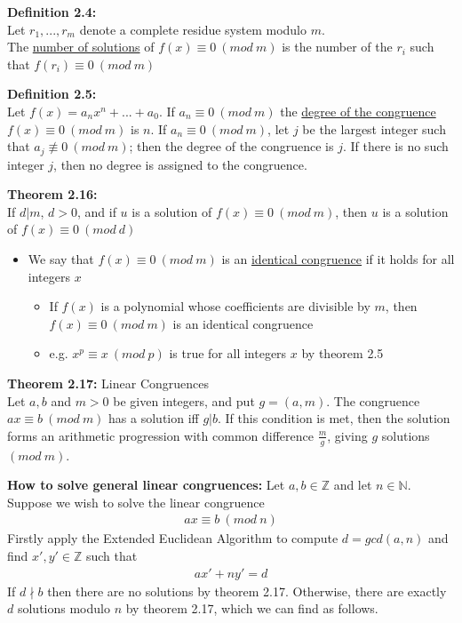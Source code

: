 \documentclass[a4paper]{article}
\begin{document}
\textbf{Definition 2.4:}\\
Let $r_1,...,r_m$ denote a complete residue system modulo $m$.\\
The \underline{number of solutions} of $f(x)\equiv0\ (mod\ m)$ is the number of
the $r_i$ such that $f(r_i)\equiv0\ (mod\ m)$


\textbf{Definition 2.5:}\\
Let $f(x)=a_nx^n+...+a_0$. If $a_n\equiv0\ (mod\ m)$ the
\underline{degree of the congruence} $f(x)\equiv0\ (mod\ m)$ is $n$.
If $a_n\equiv0\ (mod\ m)$, let $j$ be the largest integer such that
$a_j\not\equiv0\ (mod\ m)$; then the degree of the congruence is $j$.
If there is no such integer $j$, then no degree is assigned to the congruence.

\textbf{Theorem 2.16:}\\
If $d|m$, $d>0$, and if $u$ is a solution of $f(x)\equiv0\ (mod\ m)$, then $u$
is a solution of $f(x)\equiv0\ (mod\ d)$
\begin{itemize}
    \item We say that $f(x)\equiv0\ (mod\ m)$ is an
    \underline{identical congruence} if it holds for all integers $x$
    \begin{itemize}
        \item If $f(x)$ is a polynomial whose coefficients are divisible by $m$,
        then $f(x)\equiv0\ (mod\ m)$ is an identical congruence
        \item e.g. $x^p\equiv x\ (mod\ p)$ is true for all integers $x$ by theorem 2.5
    \end{itemize}
\end{itemize}

\textbf{Theorem 2.17:} Linear Congruences\\
Let $a,b$ and $m>0$ be given integers, and put $g=(a,m)$.
The congruence $ax\equiv b\ (mod\ m)$ has a solution iff $g|b$.
If this condition is met, then the solution forms an arithmetic progression
with common difference $\frac{m}{g}$, giving $g$ solutions $(mod\ m)$.

\textbf{How to solve general linear congruences:}
Let $a,b\in\mathbb{Z}$ and let $n\in\mathbb{N}$.
Suppose we wish to solve the linear congruence
\begin{align}
    ax\equiv b\ (mod\ n)
\end{align}
Firstly apply the Extended Euclidean Algorithm to compute $d=gcd(a,n)$ and find
$x',y'\in\mathbb{Z}$ such that
\begin{align}
    ax'+ny'=d
\end{align}
If $d\nmid b$ then there are no solutions by theorem 2.17. Otherwise, there
are exactly $d$ solutions modulo $n$ by theorem 2.17, which we can find as follows.
\end{document}
